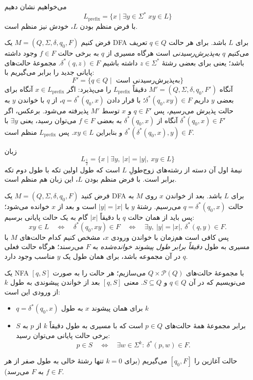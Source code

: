 
می‌خواهیم نشان دهیم
\[
L_{\text{prefix}} = \{ x \mid \exists y \in \Sigma^* \; xy \in L \}
\]
با فرض منظم بودن $L$، خودش نیز منظم است.

فرض کنیم $M = (Q, \Sigma, \delta, q_0, F)$ یک DFA برای $L$ باشد.
برای هر حالت $q \in Q$ تعریف می‌کنیم $q$ \emph{به‌پذیرش‌رسیدنی} است هرگاه مسیری از $q$ به برخی حالت $f \in F$ وجود داشته باشد؛ یعنی برای بعضی رشتهٔ $z \in \Sigma^*$ داشته باشیم $\delta^*(q,z) \in F$.
مجموعهٔ حالت‌های پایانی جدید را برابر می‌گیریم با:
\[
F' = \{ q \in Q \mid  \text{ به‌پذیرش‌رسیدنی است} \}
\]
آنگاه $M' = (Q, \Sigma, \delta, q_0, F')$ دقیقاً $L_{\text{prefix}}$ را می‌پذیرد:
اگر $x \in L_{\text{prefix}}$ آنگاه برای بعضی $y$ داریم $\delta^*(q_0, xy) \in F$؛ با قرار دادن $q = \delta^*(q_0,x)$، از $q$ با خواندن $y$ به حالت پذیرش می‌رسیم، پس $q \in F'$ و $x$ توسط $M'$ پذیرفته می‌شود.
برعکس، اگر $\delta^*(q_0,x) \in F'$ آنگاه از $\delta^*(q_0,x)$ به بعضی $f \in F$ می‌توان رسید، یعنی $\exists y$ با $\delta^*(\delta^*(q_0,x),y) \in F$ و بنابراین $xy \in L$.
پس $L_{\text{prefix}}$ منظم است.



زبان
\[
L_{\frac{1}{2}} = \{ x \mid \exists y,\ |x| = |y|,\ xy \in L \}
\]
نیمهٔ اول آن دسته از رشته‌های زوج‌طولِ $L$ است که طول اولین تکه با طول دوم تکه برابر است. با فرض منظم بودن $L$، این زبان هم منظم است.

فرض کنید $M = (Q,\Sigma,\delta,q_0,F)$ یک DFA برای $L$ باشد.
بعد از خواندن $x$ روی $M$ به حالت $q = \delta^*(q_0,x)$ می‌رسیم.
رشتهٔ $y$ با $|y| = |x|$ است و بعد از $x$ خوانده می‌شود؛ پس باید از همان حالت $q$ با دقیقاً $|x|$ گام به یک حالت پایانی برسیم:
\[
xy \in L \quad \Longleftrightarrow \quad \delta^*(q_0, xy) \in F \quad \Longleftrightarrow \quad \exists y,\ |y| = |x|,\ \delta^*(q, y) \in F .
\]
پس کافی است هم‌زمان با خواندن ورودی $x$، مشخص کنیم کدام حالت‌های $M$ با مسیری به طول \emph{دقیقاً برابر طول پیشوند خوانده‌شده} به $F$ می‌رسند؛ هرگاه حالت فعلی $q$ در آن مجموعه باشد، برای همان طول یک $y$ مناسب وجود دارد.

یک NFA با مجموعهٔ حالت‌های $Q \times \mathcal{P}(Q)$ می‌سازیم؛ هر حالت را به صورت $[q,S]$ می‌نویسیم که در آن $q \in Q$ و $S \subseteq Q$.
معنی $[q,S]$ بعد از خواندن پیشوندی به طول $k$ از ورودی این است:
\begin{itemize}
\item $q = \delta^*(q_0, x)$ برای همان پیشوند $x$ به طول $k$
\item $S$ برابر مجموعهٔ همهٔ حالت‌های $p \in Q$ است که با مسیری به طول دقیقاً $k$ از $p$ به برخی حالت پایانی می‌توان رسید:
\[
p \in S \quad \Longleftrightarrow \quad \exists w \in \Sigma^k :\ \delta^*(p,w) \in F .
\]
\end{itemize}
حالت آغازین را $[q_0, F]$ می‌گیریم (برای $k=0$ تنها رشتهٔ خالی به طول صفر از هر $f \in F$ به $F$ می‌رسد).

